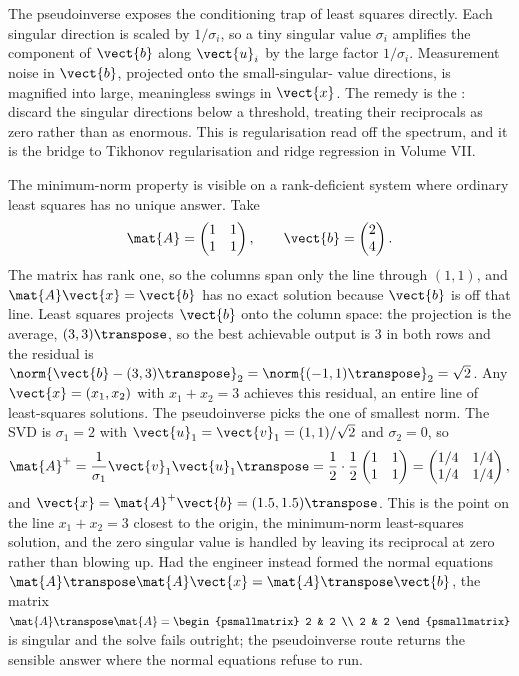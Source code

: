 The pseudoinverse exposes the conditioning trap of least squares
directly. Each singular direction is scaled by $1/\sigma_{i}$, so a
tiny singular value $\sigma_{i}$ amplifies the component of
$\vect{b}$ along $\vect{u}_{i}$ by the large factor $1/\sigma_{i}$.
Measurement noise in $\vect{b}$, projected onto the small-singular-
value directions, is magnified into large, meaningless swings in
$\vect{x}$. The remedy is the :
discard the singular directions below a threshold, treating their
reciprocals as zero rather than as enormous. This is regularisation
read off the spectrum, and it is the bridge to Tikhonov
regularisation and ridge regression in Volume VII.

\begin{example}
The minimum-norm property is visible on a rank-deficient system where
ordinary least squares has no unique answer. Take
\[
\mat{A} = \begin{pmatrix} 1 & 1 \\ 1 & 1 \end{pmatrix}, \qquad
\vect{b} = \begin{pmatrix} 2 \\ 4 \end{pmatrix}.
\]
The matrix has rank one, so the columns span only the line through
$(1,1)$, and $\mat{A}\vect{x} = \vect{b}$ has no exact solution because
$\vect{b}$ is off that line. Least squares projects $\vect{b}$ onto the
column space: the projection is the average, $(3, 3)\transpose$, so the
best achievable output is $3$ in both rows and the residual is
$\norm{\vect{b} - (3,3)\transpose}_2 = \norm{(-1,1)\transpose}_2 =
\sqrt{2}$. Any $\vect{x} = (x_1, x_2)$ with $x_1 + x_2 = 3$ achieves
this residual, an entire line of least-squares solutions. The
pseudoinverse picks the one of smallest norm. The SVD is $\sigma_1 =
2$ with $\vect{u}_1 = \vect{v}_1 = (1,1)/\sqrt{2}$ and $\sigma_2 = 0$,
so
\[
\mat{A}^{+} = \frac{1}{\sigma_1}\vect{v}_1\vect{u}_1\transpose
= \frac{1}{2}\cdot\frac{1}{2}\begin{pmatrix} 1 & 1 \\ 1 & 1
\end{pmatrix} = \begin{pmatrix} 1/4 & 1/4 \\ 1/4 & 1/4 \end{pmatrix},
\]
and $\vect{x} = \mat{A}^{+}\vect{b} = (1.5, 1.5)\transpose$. This is
the point on the line $x_1 + x_2 = 3$ closest to the origin, the
minimum-norm least-squares solution, and the zero singular value is
handled by leaving its reciprocal at zero rather than blowing up. Had
the engineer instead formed the normal equations $\mat{A}\transpose
\mat{A}\vect{x} = \mat{A}\transpose\vect{b}$, the matrix
$\mat{A}\transpose\mat{A} = \begin{psmallmatrix} 2 & 2 \\ 2 & 2
\end{psmallmatrix}$ is singular and the solve fails outright; the
pseudoinverse route returns the sensible answer where the normal
equations refuse to run.
\end{example}

